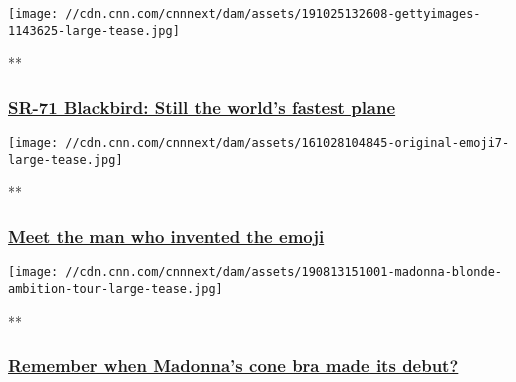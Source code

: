 \href{/videos/design/2019/11/04/blackbird-sr-71-spy-plane-design-style-orig.cnn/video/playlists/cnn-style/}{}

\texttt{[image: //cdn.cnn.com/cnnnext/dam/assets/191025132608-gettyimages-1143625-large-tease.jpg]}

**

\hypertarget{sr-71-blackbird-still-the-worlds-fastest-plane}{%
\subsubsection{\texorpdfstring{\href{/videos/design/2019/11/04/blackbird-sr-71-spy-plane-design-style-orig.cnn/video/playlists/cnn-style/}{SR-71
Blackbird: Still the world's fastest
plane}}{SR-71 Blackbird: Still the world's fastest plane}}\label{sr-71-blackbird-still-the-worlds-fastest-plane}}

\href{/videos/design/2017/05/29/emoji-digital-language-shigetaka-kurita.cnn/video/playlists/cnn-style/}{}

\texttt{[image: //cdn.cnn.com/cnnnext/dam/assets/161028104845-original-emoji7-large-tease.jpg]}

**

\hypertarget{meet-the-man-who-invented-the-emoji}{%
\subsubsection{\texorpdfstring{\href{/videos/design/2017/05/29/emoji-digital-language-shigetaka-kurita.cnn/video/playlists/cnn-style/}{Meet
the man who invented the
emoji}}{Meet the man who invented the emoji}}\label{meet-the-man-who-invented-the-emoji}}

\href{/videos/fashion/2019/08/16/madonna-cone-bra-remember-when-lon-orig.cnn/video/playlists/cnn-style/}{}

\texttt{[image: //cdn.cnn.com/cnnnext/dam/assets/190813151001-madonna-blonde-ambition-tour-large-tease.jpg]}

**

\hypertarget{remember-when-madonnas-cone-bra-made-its-debut-}{%
\subsubsection{\texorpdfstring{\href{/videos/fashion/2019/08/16/madonna-cone-bra-remember-when-lon-orig.cnn/video/playlists/cnn-style/}{Remember
when Madonna's cone bra made its debut?
}}{Remember when Madonna's cone bra made its debut? }}\label{remember-when-madonnas-cone-bra-made-its-debut-}}

